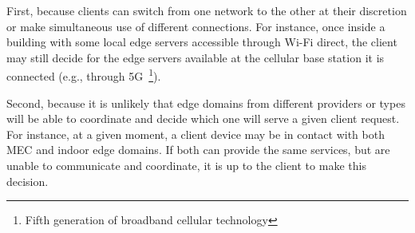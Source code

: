 %
%
%

First, because clients can switch from one network to the other at their discretion or make simultaneous use of different connections. For instance, once inside a building with some local edge servers accessible through Wi-Fi direct, the client may still decide for the edge servers available at the cellular base station it is connected (e.g., through 5G~\footnote{Fifth generation of broadband cellular technology}). 

Second, because it is unlikely that edge domains from different providers or types will be able to coordinate and decide which one will serve a given client request. For instance, at a given moment, a client device may be in contact with both MEC and indoor edge domains. If both can provide the same services, but are unable to communicate and coordinate, it is up to the client to make this decision.





